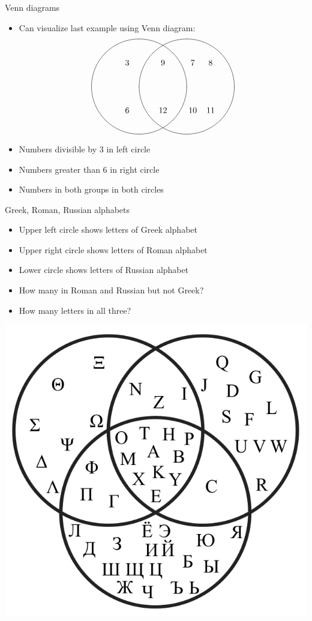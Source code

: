 \documentclass[handout]{beamer}
\theoremstyle{definition}
\begin{document}
\begin{frame}{Venn diagrams}
\begin{itemize}
\item Can visualize last example using Venn diagram:
\[\begin{xy}<1cm,0cm>:
(-1,0)*\cir<2cm>{};
(1,0)*\cir<2cm>{};
(-1.5,1)*{3};
(-1.5,-1)*{6};
(0,1)*{9};
(0,-1)*{12};
(1.25,1)*{7};
(1.25,-1)*{10};
(2,1)*{8};
(2,-1)*{11};
\end{xy}\]
\item Numbers divisible by $3$ in left circle
\item Numbers greater than $6$ in right circle
\item Numbers in both groups in both circles
\end{itemize}
\end{frame}

\begin{frame}{Greek, Roman, Russian alphabets}
\begin{multicols}{2}
\begin{itemize}
\item Upper left circle shows letters of Greek alphabet
\item Upper right circle shows letters of Roman alphabet
\item Lower circle shows letters of Russian alphabet
\item How many in Roman and Russian but not Greek?
\item How many letters in all three?
\end{itemize}
\includegraphics[scale=.25]{Venn}
\end{multicols}
\end{frame}
\end{document}
